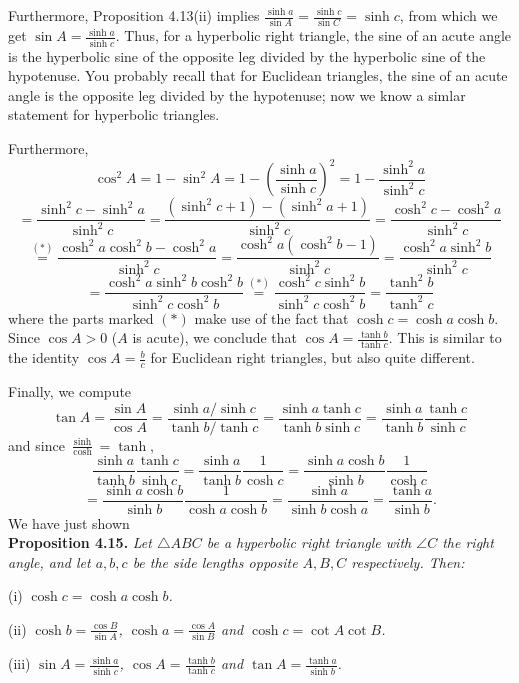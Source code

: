 \documentclass[leqno]{book}
\begin{document}
Furthermore, Proposition 4.13(ii) implies $\frac{\sinh a}{\sin A}=\frac{\sinh c}{\sin C}=\sinh c$, from which we get $\sin A=\frac{\sinh a}{\sinh c}$.  Thus, for a hyperbolic right triangle, the sine of an acute angle is the hyperbolic sine of the opposite leg divided by the hyperbolic sine of the hypotenuse.  You probably recall that for Euclidean triangles, the sine of an acute angle is the opposite leg divided by the hypotenuse; now we know a simlar statement for hyperbolic triangles.

Furthermore,
$$\cos^2A=1-\sin^2A=1-\left(\frac{\sinh a}{\sinh c}\right)^2=1-\frac{\sinh^2a}{\sinh^2c}$$
$$=\frac{\sinh^2c-\sinh^2a}{\sinh^2c}=\frac{(\sinh^2c+1)-(\sinh^2a+1)}{\sinh^2c}=\frac{\cosh^2c-\cosh^2a}{\sinh^2c}$$
$$\overset{(*)}=\frac{\cosh^2a\cosh^2b-\cosh^2a}{\sinh^2c}=\frac{\cosh^2a(\cosh^2b-1)}{\sinh^2c}=\frac{\cosh^2a\sinh^2b}{\sinh^2c}$$
$$=\frac{\cosh^2a\sinh^2b\cosh^2b}{\sinh^2c\cosh^2b}\overset{(*)}=\frac{\cosh^2c\sinh^2b}{\sinh^2c\cosh^2b}=\frac{\tanh^2b}{\tanh^2c}$$
where the parts marked $(*)$ make use of the fact that $\cosh c=\cosh a\cosh b$.  Since $\cos A>0$ ($A$ is acute), we conclude that $\cos A=\frac{\tanh b}{\tanh c}$.  This is similar to the identity $\cos A=\frac bc$ for Euclidean right triangles, but also quite different.

Finally, we compute
$$\tan A=\frac{\sin A}{\cos A}=\frac{\sinh a/\sinh c}{\tanh b/\tanh c}=\frac{\sinh a\tanh c}{\tanh b\sinh c}=\frac{\sinh a}{\tanh b}\frac{\tanh c}{\sinh c}$$
and since $\frac{\sinh}{\cosh}=\tanh$,
$$\frac{\sinh a}{\tanh b}\frac{\tanh c}{\sinh c}=\frac{\sinh a}{\tanh b}\frac 1{\cosh c}=\frac{\sinh a\cosh b}{\sinh b}\frac 1{\cosh c}$$
$$=\frac{\sinh a\cosh b}{\sinh b}\frac 1{\cosh a\cosh b}=\frac{\sinh a}{\sinh b\cosh a}=\frac{\tanh a}{\sinh b}.$$
We have just shown\\

\noindent\textbf{Proposition 4.15.} \emph{Let $\triangle ABC$ be a hyperbolic right triangle with $\angle C$ the right angle, and let $a,b,c$ be the side lengths opposite $A,B,C$ respectively.  Then:}

(i) \emph{$\cosh c=\cosh a\cosh b$.}

(ii) \emph{$\cosh b=\frac{\cos B}{\sin A}$, $\cosh a=\frac{\cos A}{\sin B}$ and $\cosh c=\cot A\cot B$.}

(iii) \emph{$\sin A=\frac{\sinh a}{\sinh c}$, $\cos A=\frac{\tanh b}{\tanh c}$ and $\tan A=\frac{\tanh a}{\sinh b}$.}\\
\end{document}
